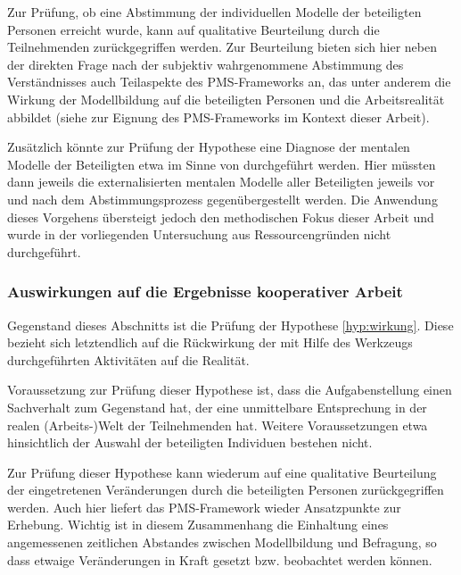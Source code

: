 Zur Prüfung, ob eine Abstimmung der individuellen Modelle der beteiligten Personen erreicht wurde, kann auf qualitative Beurteilung durch die Teilnehmenden zurückgegriffen werden. Zur Beurteilung bieten sich hier neben der direkten Frage nach der subjektiv wahrgenommene Abstimmung des Verständnisses auch Teilaspekte des \gls{PMS}-Frameworks \citep{Sedera02} an, das unter anderem die Wirkung der Modellbildung auf die beteiligten Personen und die Arbeitsrealität abbildet (siehe \citep{Wahlmuller10} zur Eignung des \gls{PMS}-Frameworks im Kontext dieser Arbeit).

Zusätzlich könnte zur Prüfung der Hypothese eine Diagnose der mentalen Modelle der Beteiligten etwa im Sinne von \citep{Ifenthaler06} durchgeführt werden. Hier müssten dann jeweils die externalisierten mentalen Modelle aller Beteiligten jeweils vor und nach dem Abstimmungsprozess gegenübergestellt werden. Die Anwendung dieses Vorgehens übersteigt jedoch den methodischen Fokus dieser Arbeit und wurde in der vorliegenden Untersuchung aus Ressourcengründen nicht durchgeführt.


\subsubsection{Auswirkungen auf die Ergebnisse kooperativer Arbeit} %
\label{ssub:auswirkungen_auf_die_ergebnisse_kooperativer_arbeit}

Gegenstand dieses Abschnitts ist die Prüfung der Hypothese \ref{hyp:wirkung}. Diese bezieht sich letztendlich auf die Rückwirkung der mit Hilfe des Werkzeugs durchgeführten Aktivitäten auf die Realität.

Voraussetzung zur Prüfung dieser Hypothese ist, dass die Aufgabenstellung einen Sachverhalt zum Gegenstand hat, der eine unmittelbare Entsprechung in der realen (Arbeits-)Welt der Teilnehmenden hat. Weitere Voraussetzungen etwa hinsichtlich der Auswahl der beteiligten Individuen bestehen nicht.

Zur Prüfung dieser Hypothese kann wiederum auf eine qualitative Beurteilung der eingetretenen Veränderungen durch die beteiligten Personen zurückgegriffen werden. Auch hier liefert das \gls{PMS}-Framework \citep{Sedera02} wieder Ansatzpunkte zur Erhebung. Wichtig ist in diesem Zusammenhang die Einhaltung eines angemessenen zeitlichen Abstandes zwischen Modellbildung und Befragung, so dass etwaige Veränderungen in Kraft gesetzt bzw. beobachtet werden können.

